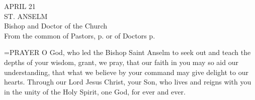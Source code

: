 \begin{center}\normalsize APRIL 21\\
\footnotesize ST. ANSELM\\
\footnotesize Bishop and Doctor of the Church\\
\footnotesize From the common of Pastors, p.     or of Doctors p. \\
\end{center}

\hangindent=\parindent \small{PRAYER 
O God, who led the Bishop Saint Anselm
to seek out and teach the depths of your wisdom,
grant, we pray,
that our faith in you may so aid our understanding,
that what we believe by your command
may give delight to our hearts.
Through our Lord Jesus Christ, your Son,
who lives and reigns with you in the unity of the Holy Spirit,
one God, for ever and ever.\\}
 
